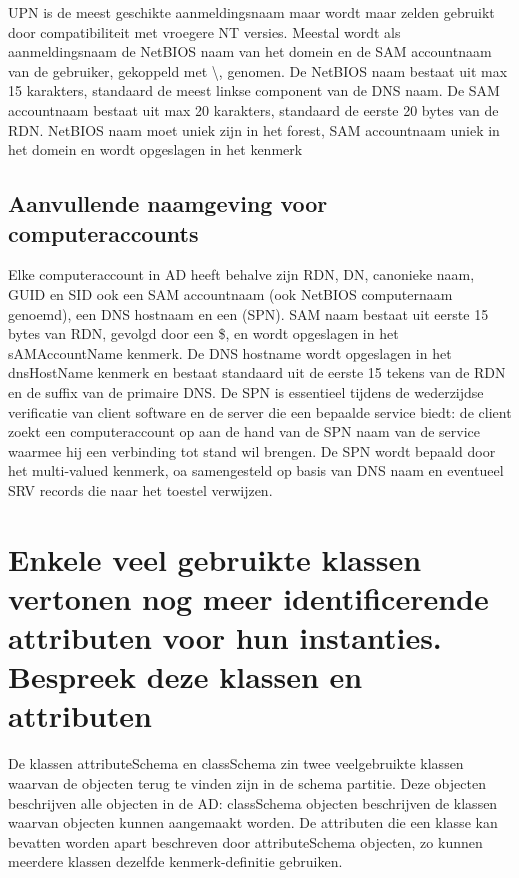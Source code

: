UPN is de meest geschikte aanmeldingsnaam maar wordt maar zelden gebruikt door
compatibiliteit met vroegere NT versies. Meestal wordt als aanmeldingsnaam de
NetBIOS naam van het domein en de SAM accountnaam van de gebruiker, gekoppeld
met \textbackslash, genomen. De NetBIOS naam bestaat uit max 15 karakters, standaard de meest
linkse component van de DNS naam. De SAM accountnaam bestaat uit max 20
karakters, standaard de eerste 20 bytes van de RDN. NetBIOS naam moet uniek zijn
in het forest, SAM accountnaam uniek in het domein en wordt opgeslagen in het
 kenmerk

\subsection{Aanvullende naamgeving voor computeraccounts}

Elke computeraccount in AD heeft behalve zijn RDN, DN, canonieke naam, GUID en
SID ook een SAM accountnaam (ook NetBIOS computernaam genoemd), een DNS hostnaam
en een  (SPN).
SAM naam bestaat uit eerste 15 bytes van RDN, gevolgd door een \$, en wordt
opgeslagen in het sAMAccountName kenmerk.
De DNS hostname wordt opgeslagen in het dnsHostName kenmerk en bestaat
standaard uit de eerste 15 tekens van de RDN en de suffix van de primaire DNS.
De SPN is essentieel tijdens de wederzijdse verificatie van client software en
de server die een bepaalde service biedt: de client zoekt een computeraccount op
aan de hand van de SPN naam van de service waarmee hij een verbinding tot stand
wil brengen. De SPN wordt bepaald door het multi-valued
 kenmerk, oa samengesteld op basis van DNS naam en
eventueel SRV records die naar het toestel verwijzen.

\section{Enkele veel gebruikte klassen vertonen nog meer identificerende
attributen voor hun instanties. Bespreek deze klassen en attributen}

De klassen attributeSchema en classSchema zin twee veelgebruikte klassen waarvan
de objecten terug te vinden zijn in de schema partitie. Deze objecten
beschrijven alle objecten in de AD: classSchema objecten beschrijven de klassen
waarvan objecten kunnen aangemaakt worden. De attributen die een klasse kan
bevatten worden apart beschreven door attributeSchema objecten, zo kunnen
meerdere klassen dezelfde kenmerk-definitie gebruiken.

